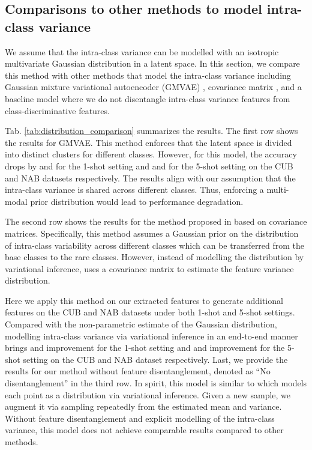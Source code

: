 \documentclass[10pt,twocolumn,letterpaper]{article}
\begin{document}
\subsection{Comparisons to other methods to model intra-class variance}

We assume that the intra-class variance can be modelled with an isotropic multivariate Gaussian distribution in a latent space.
In this section, we compare this method with other methods that model the intra-class variance including Gaussian mixture variational autoencoder (GMVAE) \cite{gmm_vae}, covariance matrix \cite{feature_transfer}, and a baseline model where we do not disentangle intra-class variance features from class-discriminative features.

Tab. \ref{tab:distribution_comparison} summarizes the results. The first row shows the results for GMVAE. This method enforces that the latent space is divided into distinct clusters for different classes. However, for this model, the accuracy drops by  and  for the 1-shot setting and  and  for the 5-shot setting on the CUB and NAB datasets respectively. The results align with our assumption that the intra-class variance is shared across different classes. Thus, enforcing a multi-modal prior distribution would lead to performance degradation. 

The second row shows the results for the method proposed in \cite{feature_transfer} based on covariance matrices.
Specifically, this method assumes a Gaussian prior on the distribution of intra-class variability across different classes which can be transferred from the base classes to the rare classes.
However, instead of modelling the distribution by variational inference, \cite{feature_transfer} uses a covariance matrix to estimate the feature variance distribution.
\begin{comment}
The augmented feature can then be calculated via:
, where  and  are the feature-level sample and the center of a regular class .
 is the feature center of an under-presented class  and  is the augmented feature for class .
 is the estimated covariance matrix after PCA projection.
\end{comment}
Here we apply this method on our extracted features to generate additional features on the CUB and NAB datasets under both 1-shot and 5-shot settings.
Compared with the non-parametric estimate of the Gaussian distribution, modelling intra-class variance via variational inference in an end-to-end manner brings  and  improvement for the  1-shot setting and  and  improvement for the 5-shot setting on the CUB and NAB dataset respectively.
Last, we provide the results for our method without  feature disentanglement, denoted as ``No disentanglement'' in the third row. In spirit, this model is similar to \cite{variational_fewshot} which models each point as a distribution via variational inference. Given a new sample, we augment it via sampling repeatedly from the estimated mean and variance. 
Without feature disentanglement and explicit modelling of the intra-class variance, this model does not achieve comparable results compared to other methods. 
\end{document}
